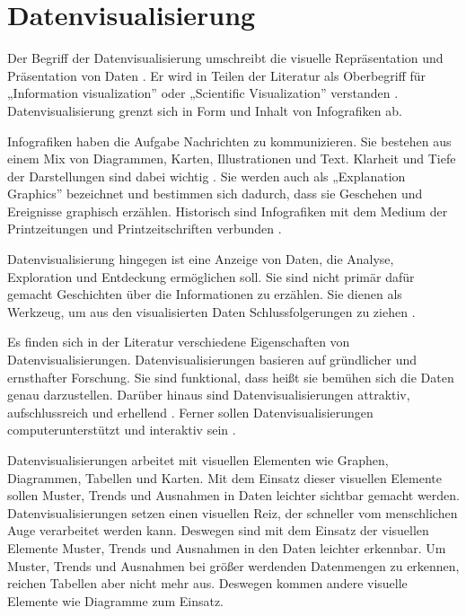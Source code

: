 \section{Datenvisualisierung}
Der Begriff der Datenvisualisierung umschreibt die visuelle Repräsentation und Präsentation von Daten \cite[Vgl.][15]{kirk_data_2019}.
Er wird in Teilen der Literatur als Oberbegriff für „Information visualization” oder „Scientific Visualization” verstanden \cite[Vgl.][11]{few_now_2009}.
Datenvisualisierung grenzt sich in Form und Inhalt von Infografiken ab. 

Infografiken haben die Aufgabe Nachrichten zu kommunizieren.
Sie bestehen aus einem Mix von Diagrammen, Karten, Illustrationen und Text. Klarheit und Tiefe der Darstellungen sind dabei wichtig
\cite[Vgl.][31]{cairo_truthful_2016}. Sie werden auch als „Explanation Graphics”
bezeichnet und bestimmen sich dadurch, dass sie Geschehen und Ereignisse graphisch erzählen. 
Historisch sind Infografiken mit dem Medium der Printzeitungen und Printzeitschriften verbunden \cite[Vgl.][27]{kirk_data_2019}.

Datenvisualisierung hingegen ist eine Anzeige von Daten, die Analyse, Exploration und Entdeckung ermöglichen soll.
Sie sind nicht primär dafür gemacht Geschichten über die Informationen zu erzählen. Sie dienen als Werkzeug, um aus den visualisierten Daten Schlussfolgerungen zu ziehen 
\cite[Vgl.][31]{cairo_truthful_2016}.


Es finden sich in der Literatur verschiedene Eigenschaften von Datenvisualisierungen.
Datenvisualisierungen basieren auf gründlicher und ernsthafter Forschung. Sie sind funktional, dass heißt
sie bemühen sich die Daten genau darzustellen. Darüber hinaus sind Datenvisualisierungen attraktiv, 
aufschlussreich und erhellend \cite[Vgl.][45]{cairo_truthful_2016}. 
Ferner sollen Datenvisualisierungen computerunterstützt und interaktiv sein \cite[Vgl.][12]{few_now_2009}.


Datenvisualisierungen arbeitet mit visuellen Elementen wie Graphen, Diagrammen, Tabellen und Karten.
Mit dem Einsatz dieser visuellen Elemente sollen Muster, Trends und Ausnahmen in Daten leichter sichtbar gemacht werden\cite[Vgl.][12]{few_now_2009}.
Datenvisualisierungen setzen einen visuellen Reiz, der schneller vom menschlichen Auge verarbeitet werden kann. 
Deswegen sind mit dem Einsatz der visuellen Elemente Muster, Trends und Ausnahmen in den Daten leichter erkennbar.
Um Muster, Trends und Ausnahmen bei größer werdenden Datenmengen zu erkennen, reichen Tabellen aber nicht mehr aus. Deswegen
kommen andere visuelle Elemente wie Diagramme zum Einsatz. 


